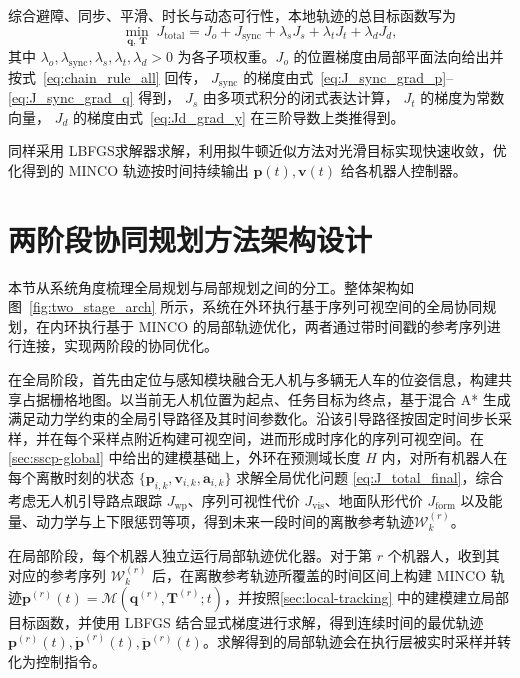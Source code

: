 综合避障、同步、平滑、时长与动态可行性，本地轨迹的总目标函数写为
\begin{equation}
\label{eq:J_total_minco_final}
\min_{\mathbf{q},\,\mathbf{T}}\;
J_{\mathrm{total}}
=J_{o}
+J_{\mathrm{sync}}
+\lambda_{s} J_{s}
+\lambda_{t} J_{t}
+\lambda_{d} J_{d},
\end{equation}
其中 \(\lambda_{o},\lambda_{\mathrm{sync}},\lambda_{s},\lambda_{t},\lambda_{d}>0\) 为各子项权重。\(
J_o\) 的位置梯度由局部平面法向给出并按式~\eqref{eq:chain_rule_all} 回传，
\(J_{\mathrm{sync}}\) 的梯度由式~\eqref{eq:J_sync_grad_p}–\eqref{eq:J_sync_grad_q} 得到，
\(J_s\) 由多项式积分的闭式表达计算，
\(J_t\) 的梯度为常数向量，
\(J_d\) 的梯度由式~\eqref{eq:Jd_grad_y} 在三阶导数上类推得到。

同样采用 L\text{-}BFGS求解器求解，利用拟牛顿近似方法对光滑目标实现快速收敛，优化得到的 MINCO 轨迹按时间持续输出 \(\mathbf{p}(t),\mathbf{v}(t)\) 给各机器人控制器。

\section{两阶段协同规划方法架构设计} \label{sec:two-stage-arch}

本节从系统角度梳理全局规划与局部规划之间的分工。整体架构如图~\ref{fig:two_stage_arch} 所示，系统在外环执行基于序列可视空间的全局协同规划，在内环执行基于 MINCO 的局部轨迹优化，两者通过带时间戳的参考序列进行连接，实现两阶段的协同优化。

在全局阶段，首先由定位与感知模块融合无人机与多辆无人车的位姿信息，构建共享占据栅格地图。以当前无人机位置为起点、任务目标为终点，基于混合 A* 生成满足动力学约束的全局引导路径及其时间参数化。沿该引导路径按固定时间步长采样，并在每个采样点附近构建可视空间，进而形成时序化的序列可视空间。在\autoref{sec:sscp-global} 中给出的建模基础上，外环在预测域长度 \(H\) 内，对所有机器人在每个离散时刻的状态 \(\{\mathbf{p}_{i,k},\mathbf{v}_{i,k},\mathbf{a}_{i,k}\}\) 求解全局优化问题 \eqref{eq:J_total_final}，综合考虑无人机引导路点跟踪 \(J_{\mathrm{wp}}\)、序列可视性代价 \(J_{\mathrm{vis}}\)、地面队形代价 \(J_{\mathrm{form}}\) 以及能量、动力学与上下限惩罚等项，得到未来一段时间的离散参考轨迹\(\mathcal{W}^{(r)}_k\)。

在局部阶段，每个机器人独立运行局部轨迹优化器。对于第 \(r\) 个机器人，收到其对应的参考序列 \(\mathcal{W}^{(r)}_k\) 后，在离散参考轨迹所覆盖的时间区间上构建 MINCO 轨迹\(\mathbf{p}^{(r)}(t)=\mathcal{M}(\mathbf{q}^{(r)},\mathbf{T}^{(r)};t)\)，并按照\autoref{sec:local-tracking} 中的建模建立局部目标函数，并使用 L\text{-}BFGS 结合显式梯度进行求解，得到连续时间的最优轨迹 \(\mathbf{p}^{(r)}(t),\dot{\mathbf{p}}^{(r)}(t),\ddot{\mathbf{p}}^{(r)}(t)\)。求解得到的局部轨迹会在执行层被实时采样并转化为控制指令。

